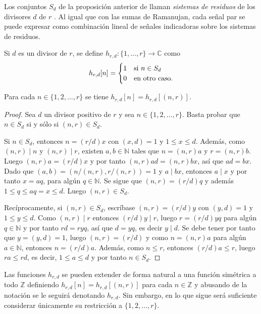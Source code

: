 Los conjuntos $S_d$ de la proposición anterior de llaman \emph{sistemas de residuos} de los divisores $d$ de $r$ \cite{Sam1}. Al igual que con las sumas de Ramanujan, cada señal par se puede expresar como combinación lineal de señales indicadoras sobre los sistemas de residuos.

\begin{definition}
Si $d$ es un divisor de $r$, se define $h_{r,d} : \{ 1,\ldots,r \} \longrightarrow \mathbb{C}$ como
\begin{equation*}
    h_{r,d}[n] = \begin{cases}
        \hfil 1 & \text{si } n \in S_d \\
        \hfil 0 & \text{en otro caso.}
    \end{cases}
\end{equation*}
\end{definition}

\begin{proposition}
Para cada $n \in \{ 1,2,\ldots,r \}$ se tiene $h_{r,d}[n]=h_{r,d}[(n,r)]$.
\end{proposition}

\begin{proof}
Sea $d$ un divisor positivo de $r$ y sea $n \in \{ 1,2,\ldots,r \}$. Basta probar que $n \in S_d$ si y sólo si $(n,r) \in S_d$.
\bigskip

Si $n \in S_d$, entonces $n=(r/d) x$ con $(x,d)=1$ y $1 \le x \le d$. Además, como $(n,r) \mid n$ y $(n,r) \mid r$, existen $a,b \in \mathbb{N}$ tales que $n = (n,r) a$  y $r = (n,r) b$. Luego $(n,r) a = (r/d) x$ y por tanto $(n,r) a d = (n,r) b x$, así que $a d = b x$. Dado que $(a,b)=(n/(n,r), r/(n,r))=1$ y $a \mid b x$, entonces $a \mid x$ y por tanto $x = a q$, para algún $q \in \mathbb{N}$. Se sigue que $(n,r) = (r/d) q$ y además $1 \le q \le a q = x \le d$. Luego $(n,r) \in S_d$.
\bigskip

Recíprocamente, si $(n,r) \in S_d$, escríbase $(n,r) = (r/d) y$ con $(y,d)=1$ y $1 \le y \le d$. Como $(n,r) \mid r$ entonces $(r/d) y \mid r$, luego $r = (r/d) y q$ para algún $q \in \mathbb{N}$ y por tanto $r d = r y q$, así que $d = y q$, es decir $y \mid d$. Se debe tener por tanto que $y=(y,d)=1$, luego $(n,r)=(r/d)$ y como $n=(n,r)a$ para algún $a \in \mathbb{N}$, entonces $n = (r/d)a$. Además, como $n \le r$, entonces $(r/d) a \le r$, luego $r a \le r d$, es decir, $1 \le a \le d$ y por tanto $n \in S_d$.
\end{proof}

Las funciones $h_{r,d}$ se pueden extender de forma natural a una función simétrica a todo $\mathbb{Z}$ definiendo $h_{r,d}[n] = h_{r,d}[(n,r)]$ para cada $n \in \mathbb{Z}$ y abusando de la notación se le seguirá denotando $h_{r,d}$. Sin embargo, en lo que sigue será suficiente considerar únicamente su restricción a $\{ 1,2,\ldots,r \}$.

